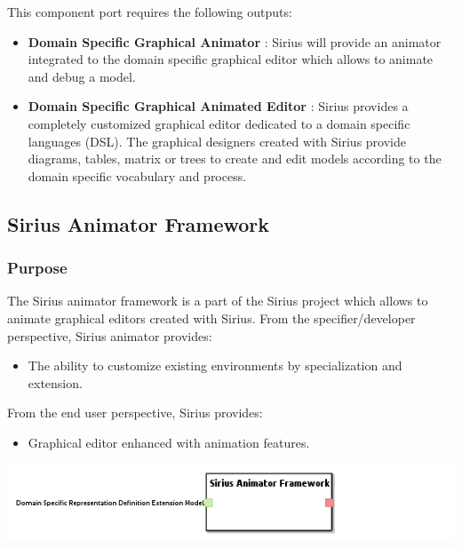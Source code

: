 \documentclass{gemoc} %
\begin{document}
This component port requires the following outputs:
\begin{itemize}
  \item \textbf{Domain Specific Graphical Animator} :
Sirius will provide an animator integrated to the domain specific graphical editor which allows to animate and debug a model. 
  \item \textbf{Domain Specific Graphical Animated Editor} :
Sirius provides a completely customized graphical editor dedicated to a domain specific languages (DSL). The graphical designers created with Sirius provide diagrams, tables, matrix or trees to create and edit models according to the domain specific vocabulary and process.
\end{itemize}

\subsection{Sirius Animator Framework}


\subsubsection{Purpose}
The Sirius animator framework is a part of the Sirius project which allows to animate graphical editors created with Sirius.
From the specifier/developer perspective, Sirius animator provides:
\begin{itemize}
\item The ability to customize existing environments by specialization and extension.
\end{itemize}
From the end user perspective, Sirius provides:
\begin{itemize}
\item Graphical editor enhanced with animation features.
\end{itemize}
\begin{center}
\includegraphics*[trim=0.0cm 0.0cm 0cm 0.0cm, clip=true]{../images/generated/Generated_Sirius_Animator_Framework.png}
\end{center}
\end{document}
